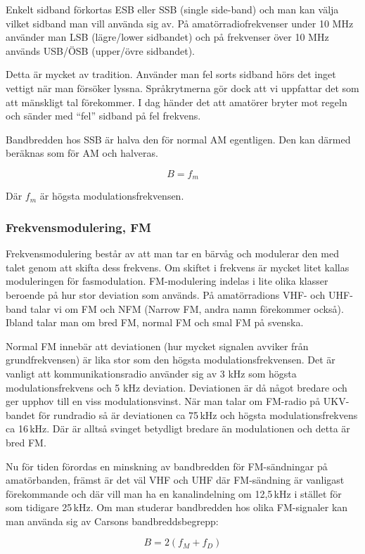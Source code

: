 Enkelt sidband förkortas ESB eller SSB (single side-band) och man kan välja vilket sidband man vill använda sig av. På amatörradiofrekvenser under 10 MHz använder man LSB (lägre/lower sidbandet) och på frekvenser över 10 MHz används USB/ÖSB (upper/övre sidbandet). 

Detta är mycket av tradition. Använder man fel sorts sidband hörs det inget vettigt när man försöker lyssna. Språkrytmerna gör dock att vi uppfattar det som att mänskligt tal förekommer. I dag händer det att amatörer bryter mot regeln och sänder med ``fel'' sidband på fel frekvens.

Bandbredden hos SSB är halva den för normal AM egentligen. Den kan därmed beräknas som för AM och halveras.

$$B=f_m$$

Där $f_m$ är högsta modulationsfrekvensen.

\subsubsection{Frekvensmodulering, FM}

Frekvensmodulering består av att man tar en bärvåg och modulerar den med talet genom att skifta dess frekvens. Om skiftet i frekvens är mycket litet kallas moduleringen för fasmodulation. FM-modulering indelas i lite olika klasser beroende på hur stor deviation som används. På amatörradions VHF- och UHF-band talar vi om FM och NFM (Narrow FM, andra namn förekommer också). Ibland talar man om bred FM, normal FM och smal FM på svenska.

Normal FM innebär att deviationen (hur mycket signalen avviker från grundfrekvensen) är lika stor som den högsta modulationsfrekvensen. Det är vanligt att kommunikationsradio använder sig av 3 kHz som högsta modulationsfrekvens och 5 kHz deviation. Deviationen är då något bredare och ger upphov till en viss modulationsvinst. När man talar om FM-radio på UKV-bandet för rundradio så är deviationen ca 75\,kHz och högsta modulationsfrekvens ca 16\,kHz. Där är alltså svinget betydligt bredare än modulationen och detta är bred FM.

Nu för tiden förordas en minskning av bandbredden för FM-sändningar på amatörbanden, främst är det väl VHF och UHF där FM-sändning är vanligast förekommande och där vill man ha en kanalindelning om 12,5\,kHz i stället för som tidigare 25\,kHz. Om man studerar bandbredden hos olika FM-signaler kan man använda sig av Carsons bandbreddsbegrepp:

$$B=2(f_M+f_D)$$

